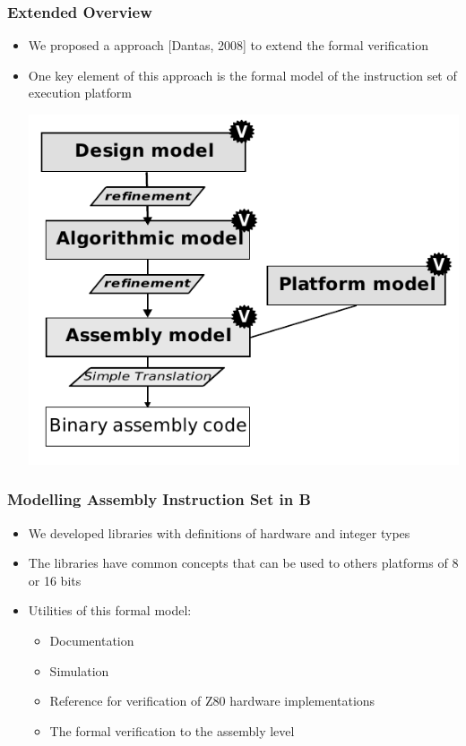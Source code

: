 \begin{frame}
\frametitle{Extended Overview}  

\begin{itemize}%
    \item We proposed a approach [Dantas, 2008] to extend the formal
    verification
    \item One key element of this approach is the formal model of the
    instruction set of execution platform %
     \\ \begin{center}     \includegraphics[height=.5\textheight]{figures/b-method-ideal_new.pdf} \end{center}
\end{itemize}
\end{frame}


\begin{frame}
\frametitle{Modelling Assembly Instruction Set in B}  

\begin{itemize}[<+->]
  \item We developed libraries with definitions of hardware and integer types
  \item The libraries have common concepts that can be used to others platforms of 8 or 16 bits
  \item Utilities of this formal model:
  \begin{itemize}
    \item Documentation
    \item Simulation
    \item Reference for verification of Z80 hardware implementations 
    \item The formal verification to the assembly level


  \end{itemize}
\end{itemize}

\end{frame}


